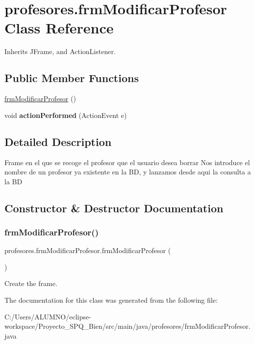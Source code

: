 \hypertarget{classprofesores_1_1frm_modificar_profesor}{}\section{profesores.\+frm\+Modificar\+Profesor Class Reference}
\label{classprofesores_1_1frm_modificar_profesor}


Inherits J\+Frame, and Action\+Listener.

\subsection*{Public Member Functions}
\begin{DoxyCompactItemize}
\item 
\hyperlink{classprofesores_1_1frm_modificar_profesor_a5f422c801b14a7c85dd14e537acaebf4}{frm\+Modificar\+Profesor} ()
\item 
\mbox{\label{classprofesores_1_1frm_modificar_profesor_ada996c494d115eab03b2bc8c711a5d1d}} 
void {\bfseries action\+Performed} (Action\+Event e)
\end{DoxyCompactItemize}


\subsection{Detailed Description}
Frame en el que se recoge el profesor que el usuario desea borrar Nos introduce el nombre de un profesor ya existente en la BD, y lanzamos desde aqui la consulta a la BD 

\subsection{Constructor \& Destructor Documentation}
\mbox{\label{classprofesores_1_1frm_modificar_profesor_a5f422c801b14a7c85dd14e537acaebf4}} 
\subsubsection{\texorpdfstring{frm\+Modificar\+Profesor()}{frmModificarProfesor()}}
{\footnotesize\ttfamily profesores.\+frm\+Modificar\+Profesor.\+frm\+Modificar\+Profesor (\begin{DoxyParamCaption}{ }\end{DoxyParamCaption})}

Create the frame. 

The documentation for this class was generated from the following file\+:\begin{DoxyCompactItemize}
\item 
C\+:/\+Users/\+A\+L\+U\+M\+N\+O/eclipse-\/workspace/\+Proyecto\+\_\+\+S\+P\+Q\+\_\+Bien/src/main/java/profesores/frm\+Modificar\+Profesor.\+java\end{DoxyCompactItemize}

